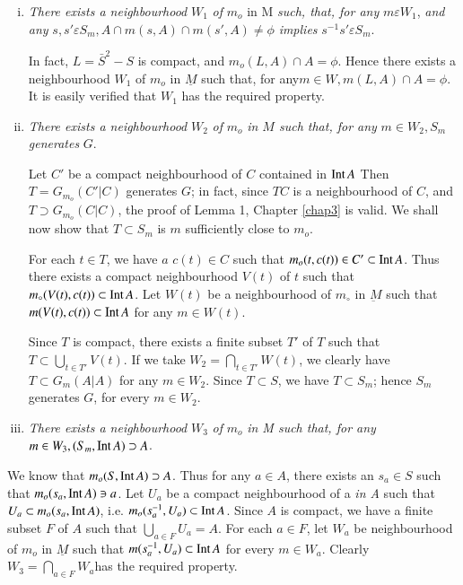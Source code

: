 \begin{enumerate}[(i)]
\item \textit{There exists a neighbourhood} $W_1$ {\em of} $m_o$ in
  M \textit{such, that, for any} $m \varepsilon W_1$, \textit{and any}
  $s,s' \varepsilon S_m, A \cap m (s, A) \cap m (s', A) \neq \phi $
  \textit{implies} $s^{-1} s' \varepsilon S_m$. 

   In fact, $L = \bar{S}^2 - S$ is compact, and $m_o (L,A) \cap A =
   \phi$. Hence there exists a neighbourhood $W_1$ of $m_o$ in
   $\underline{M}$ such that, for any\pageoriginale $m \in W, m(L, A) \cap
   A=\phi$. It is easily verified that $W_1$ has the required
   property. 

\item \textit{There exists a neighbourhood} $W_2$ \textit{of} $m_o$
  \textit{in $M$ such that, for any} $m \in W_2, S_m$ \textit{generates}
  $G$. 

  Let $C'$ be a compact neighbourhood  of $C$ contained in $\operatorname{Int} A$
  Then $T=G_{m_o}(C'|C)$ generates $G$; in fact, since $TC$ is a
  neighbourhood of $C$, and $T \supset G_{m_o}(C| C)$, the proof of
  Lemma 1, Chapter \ref{chap3} is valid. We shall now
  show that $T\subset 
  S_m$ is $m$ sufficiently close to $m_o$. 

  For each $t \in  T$, we have $a$ $c(t) \in C$ such that $m_o(t,  c(t))
  \in C' \subset \operatorname{Int} A$. Thus there exists a compact neighbourhood
  $V(t)$ of $t$ such that $m_\circ(V(t), c(t)) \subset \operatorname{Int} A$. Let
  $W(t)$ be a neighbourhood of $m_\circ$ in $\underbar{M}$  such
  that $m(V(t), c(t)) \subset \operatorname{Int} A$ for any  $m \in W(t)$. 

  Since $T$ is compact, there exists a finite subset $T'$ of $T$ such
  that $T \subset \bigcup\limits_{t \in  T'}V(t)$. If we take $W_2=
  \bigcap\limits_{t \in T'}W(t)$, we clearly have $T \subset G_m(A|A)$
  for any $m \in W_2$. Since $T \subset S$, we have $T\subset S_m$;
  hence $S_m$ generates $G$, for every $m \in W_2$.  

\item \textit{There exists a neighbourhood} $W_3$ 
  \textit{of} $m_o$ \textit{in M such that, for any} $m \in W_3,
  (S_m,\operatorname{Int} A) \supset A$. 
\end{enumerate}

We know that $m_o(S, \operatorname{Int} A) \supset A$. Thus for any $a \in A$, there
exists an $s_a \in S$ such that $m_o(s_a, \operatorname{Int} A) \ni a$.  Let $U_a$ be
a compact neighbourhood of a \textit{ in A} such that $U_a \subset m_o
(s_a, \operatorname{Int} A)$, i.e. $m_o (s^{-1}_a, U_a) \subset \operatorname{Int} A$. Since $A$ is
compact, we have a finite subset $F$ of $A$ such that
$\bigcup\limits_{a \in F} U_a =A$. For each $a \in F$, let $W_a$ be
neighbourhood of $m_o$ in $\underline{M}$ such that $m(s^{-1}_a, U_a)
\subset \operatorname{Int} A$ for every $m \in W_a$. Clearly $W_3 = \bigcap\limits_{a
  \in F} W_a$\pageoriginale has the required property. 

